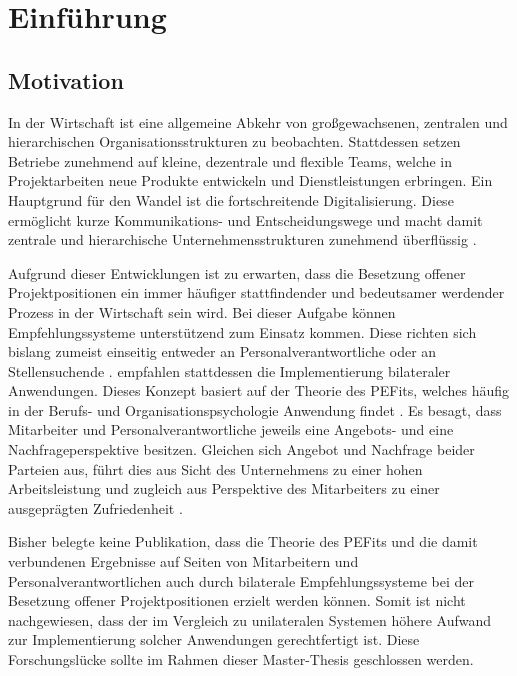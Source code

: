 \chapter{Einführung}
\label{ch:intro}

\section{Motivation}
\label{sec:intro:motivation}
In der Wirtschaft ist eine allgemeine Abkehr von großgewachsenen, zentralen und hierarchischen Organisationsstrukturen zu beobachten. Stattdessen setzen Betriebe zunehmend auf kleine, dezentrale und flexible Teams, welche in Projektarbeiten neue Produkte entwickeln und Dienstleistungen erbringen. Ein Hauptgrund für den Wandel ist die fortschreitende Digitalisierung. Diese ermöglicht kurze Kommunikations- und Entscheidungswege und macht damit zentrale und hierarchische Unternehmensstrukturen zunehmend überflüssig \cite[S. 2ff.]{elanceEconomy:1999}.

Aufgrund dieser Entwicklungen ist zu erwarten, dass die Besetzung offener Projektpositionen ein immer häufiger stattfindender und bedeutsamer werdender Prozess in der Wirtschaft sein wird. Bei dieser Aufgabe können Empfehlungssysteme unterstützend zum Einsatz kommen. Diese richten sich bislang zumeist einseitig entweder an Personalverantwortliche oder an Stellensuchende \cite[S. 2f.]{siting:2012}. \textcite[S. 1ff.]{malinowski:2006} empfahlen stattdessen die Implementierung bilateraler Anwendungen. Dieses Konzept basiert auf der Theorie des \aclp{PEFit}, welches häufig in der Berufs- und Organisationspsychologie Anwendung findet \cite[S. 2]{guan:2021}. Es besagt, dass Mitarbeiter und Personalverantwortliche jeweils eine Angebots- und eine Nachfrageperspektive besitzen. Gleichen sich Angebot und Nachfrage beider Parteien aus, führt dies aus Sicht des Unternehmens zu einer hohen Arbeitsleistung und zugleich aus Perspektive des Mitarbeiters zu einer ausgeprägten Zufriedenheit \cite[S. 6]{su:2015}.

Bisher belegte keine Publikation, dass die Theorie des \aclp{PEFit} und die damit verbundenen Ergebnisse auf Seiten von Mitarbeitern und Personalverantwortlichen auch durch bilaterale Empfehlungssysteme bei der Besetzung offener Projektpositionen erzielt werden können. Somit ist nicht nachgewiesen, dass der im Vergleich zu unilateralen Systemen höhere Aufwand zur Implementierung solcher Anwendungen gerechtfertigt ist. Diese Forschungslücke sollte im Rahmen dieser Master-Thesis geschlossen werden.


